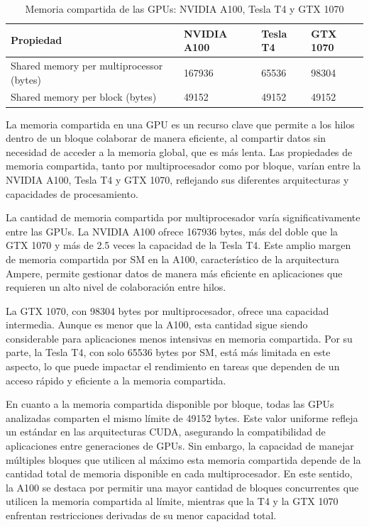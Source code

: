 \documentclass{article}
\begin{document}
			\begin{table}[H]
				\begin{adjustbox}{width=\textwidth, keepaspectratio}
					\begin{tabular}{|l|l|l|l|}
						\hline
						\textbf{Propiedad} & \textbf{NVIDIA A100} & \textbf{Tesla T4} & \textbf{GTX 1070} \\ \hline
						Shared memory per multiprocessor (bytes) & 167936 & 65536 & 98304 \\ \hline
						Shared memory per block (bytes) & 49152 & 49152 & 49152 \\ \hline
					\end{tabular}
				\end{adjustbox}
				\centering
				\caption{Memoria compartida de las GPUs: NVIDIA A100, Tesla T4 y GTX 1070}
			\end{table}

			La memoria compartida en una GPU es un recurso clave que permite a los hilos dentro de un bloque colaborar de manera eficiente, al compartir datos sin necesidad de acceder a la memoria global, que es más lenta. Las propiedades de memoria compartida, tanto por multiprocesador como por bloque, varían entre la NVIDIA A100, Tesla T4 y GTX 1070, reflejando sus diferentes arquitecturas y capacidades de procesamiento.

			La cantidad de memoria compartida por multiprocesador varía significativamente entre las GPUs. La NVIDIA A100 ofrece 167936 bytes, más del doble que la GTX 1070 y más de 2.5 veces la capacidad de la Tesla T4. Este amplio margen de memoria compartida por SM en la A100, característico de la arquitectura Ampere, permite gestionar datos de manera más eficiente en aplicaciones que requieren un alto nivel de colaboración entre hilos.

			La GTX 1070, con 98304 bytes por multiprocesador, ofrece una capacidad intermedia. Aunque es menor que la A100, esta cantidad sigue siendo considerable para aplicaciones menos intensivas en memoria compartida. Por su parte, la Tesla T4, con solo 65536 bytes por SM, está más limitada en este aspecto, lo que puede impactar el rendimiento en tareas que dependen de un acceso rápido y eficiente a la memoria compartida.

			En cuanto a la memoria compartida disponible por bloque, todas las GPUs analizadas comparten el mismo límite de 49152 bytes. Este valor uniforme refleja un estándar en las arquitecturas CUDA, asegurando la compatibilidad de aplicaciones entre generaciones de GPUs. Sin embargo, la capacidad de manejar múltiples bloques que utilicen al máximo esta memoria compartida depende de la cantidad total de memoria disponible en cada multiprocesador. En este sentido, la A100 se destaca por permitir una mayor cantidad de bloques concurrentes que utilicen la memoria compartida al límite, mientras que la T4 y la GTX 1070 enfrentan restricciones derivadas de su menor capacidad total.
\end{document}

